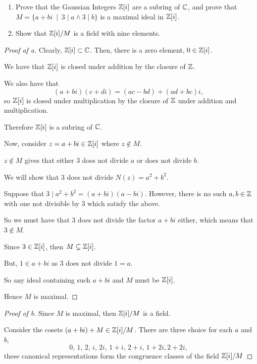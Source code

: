 \documentclass[../hw8]{subfiles}
\begin{document}
\begin{problem}
\begin{enumerate}[label = \alph*)]
	\item Prove that the Gaussian Integers $\mathbb{Z}[i]$ are a subring of $\mathbb{C}$,
	      and prove that $M=\{a+bi \ \mid\ 3\mid a \land 3\mid b  \} $ is a maximal ideal in $\mathbb{Z}[i]$.
	\item Show that $\mathbb{Z}[i] / M$ is a field with nine elements.
\end{enumerate}
\end{problem}
\begin{proof}[Proof af a]
	Clearly, $\mathbb{Z}[i]\subset \mathbb{C}$.
	Then, there is a zero element, $0\in \mathbb{Z}[i]$.

	We have that $\mathbb{Z}[i]$ is closed under addition by the closure of $\mathbb{Z}$.

	We also have that \[
		(a+bi)(c+di)=(ac-bd)+(ad+bc)i
		,\] so $\mathbb{Z}[i]$ is closed under multiplication by the closure of $\mathbb{Z}$ under addition and multiplication.

	Therefore $\mathbb{Z}[i]$ is a subring of $\mathbb{C}$.

	Now, consider $z = a+bi \in \mathbb{Z}[i]$ where $z\not\in M$.

	$z \not\in M$ gives that either 3 does not divide $a$ or does not divide $b$.

	We will show that  $3$ does not divide  $N(z)=a^2 + b^2$.

	Suppose that $3\mid a^2 + b^2 = (a+bi)(a-bi)$.
	However, there is no such $a,b\in \mathbb{Z}$ with one not divisible by 3 which satisfy the above.

	So we must have that 3 does not divide the factor $a+bi$ either, which means that  $3\not\in M$.

	Since $3 \in \mathbb{Z}[i]$, then $M\subsetneq \mathbb{Z}[i]$.

	But, $1\in a+bi$ as $3$ does not divide  $1=a$.

	So any ideal containing such $a+bi$ and  $M$ must be  $\mathbb{Z}[i]$.

	Hence $M$ is maximal.
\end{proof}
\begin{proof}[Proof  of b]
	Since $M$ is maximal, then  $\mathbb{Z}[i]/M$ is a field.

	Consider the cosets $(a+bi)+M\in \mathbb{Z}[i] / M$.
	There are three choice for  each $a$ and $b$, \[
		0,\, 1,\, 2,\, i,\, 2i,\, 1+i,\, 2+i,\, 1+2i, 2+2i
		,\] these canonical representations form the congruence classes of the field $\mathbb{Z}[i]/M$
\end{proof}
\end{document}
